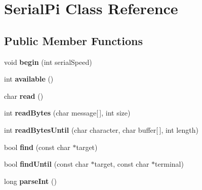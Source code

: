 \hypertarget{class_serial_pi}{}\section{Serial\+Pi Class Reference}
\label{class_serial_pi}
\subsection*{Public Member Functions}
\begin{DoxyCompactItemize}
\item 
\hypertarget{class_serial_pi_adbc3accf66007a96aa750a03cd219a0b}{}void {\bfseries begin} (int serial\+Speed)\label{class_serial_pi_adbc3accf66007a96aa750a03cd219a0b}

\item 
\hypertarget{class_serial_pi_a0d2699e213dfad1bce58e92a2579b863}{}int {\bfseries available} ()\label{class_serial_pi_a0d2699e213dfad1bce58e92a2579b863}

\item 
\hypertarget{class_serial_pi_a6f83b0cb8ba859a455ea36750b573c50}{}char {\bfseries read} ()\label{class_serial_pi_a6f83b0cb8ba859a455ea36750b573c50}

\item 
\hypertarget{class_serial_pi_a1d79e70525ffa68bf026c6f700a72a7d}{}int {\bfseries read\+Bytes} (char message\mbox{[}$\,$\mbox{]}, int size)\label{class_serial_pi_a1d79e70525ffa68bf026c6f700a72a7d}

\item 
\hypertarget{class_serial_pi_ab7b0db6fbad0eb1c4d14240201fe86e1}{}int {\bfseries read\+Bytes\+Until} (char character, char buffer\mbox{[}$\,$\mbox{]}, int length)\label{class_serial_pi_ab7b0db6fbad0eb1c4d14240201fe86e1}

\item 
\hypertarget{class_serial_pi_ac54a1211644fd6a6452cb9841b9840ff}{}bool {\bfseries find} (const char $\ast$target)\label{class_serial_pi_ac54a1211644fd6a6452cb9841b9840ff}

\item 
\hypertarget{class_serial_pi_a5d614a2d05e21d68f0256b2abe8e0328}{}bool {\bfseries find\+Until} (const char $\ast$target, const char $\ast$terminal)\label{class_serial_pi_a5d614a2d05e21d68f0256b2abe8e0328}

\item 
\hypertarget{class_serial_pi_a267bd474bb5bbeb194c6e8d8f76879f0}{}long {\bfseries parse\+Int} ()\label{class_serial_pi_a267bd474bb5bbeb194c6e8d8f76879f0}


\end{DoxyCompactItemize}
